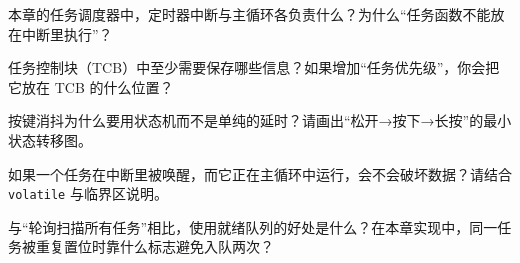 
\begin{problemset}
\item 本章的任务调度器中，定时器中断与主循环各负责什么？为什么“任务函数不能放在中断里执行”？
\item 任务控制块（TCB）中至少需要保存哪些信息？如果增加“任务优先级”，你会把它放在 TCB 的什么位置？
\item 按键消抖为什么要用状态机而不是单纯的延时？请画出“松开→按下→长按”的最小状态转移图。
\item 如果一个任务在中断里被唤醒，而它正在主循环中运行，会不会破坏数据？请结合 \texttt{volatile} 与临界区说明。
\item 与“轮询扫描所有任务”相比，使用就绪队列的好处是什么？在本章实现中，同一任务被重复置位时靠什么标志避免入队两次？
\end{problemset}
